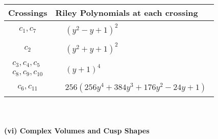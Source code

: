 \documentclass[1p]{elsarticle_modified}
\theoremstyle{definition}
\begin{document}
\begin{tabular}{m{50pt}|m{274pt}}
Crossings & \hspace{64pt}Riley Polynomials at each crossing \\
\hline $$\begin{aligned}c_{1},c_{7}\end{aligned}$$&$\begin{aligned}
&(y^2- y+1)^2
\end{aligned}$\\
\hline $$\begin{aligned}c_{2}\end{aligned}$$&$\begin{aligned}
&(y^2+y+1)^2
\end{aligned}$\\
\hline $$\begin{aligned}c_{3},c_{4},c_{5}\\c_{8},c_{9},c_{10}\end{aligned}$$&$\begin{aligned}
&(y+1)^4
\end{aligned}$\\
\hline $$\begin{aligned}c_{6},c_{11}\end{aligned}$$&$\begin{aligned}
&256(256 y^4+384 y^3+176 y^2-24 y+1)
\end{aligned}$\\
\hline
\end{tabular}\\~\\
\newpage\flushleft \textbf{(vi) Complex Volumes and Cusp Shapes}
\end{document}
